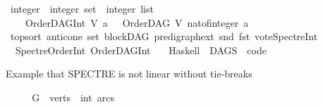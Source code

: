 \begin{isabellebody}
\ integer\ {\isasymRightarrow}\ {\isacharparenleft}{\kern0pt}integer\ set\ {\isasymtimes}\ integer\ list{\isacharparenright}{\kern0pt}{\isachardoublequoteclose}\ \isanewline
\ \ \ {\isachardoublequoteopen}\ OrderDAG{\isacharunderscore}{\kern0pt}Int\ V\ a\ {\isacharequal}{\kern0pt}\ \ {\isacharparenleft}{\kern0pt}OrderDAG\ V\ {\isacharparenleft}{\kern0pt}nat{\isacharunderscore}{\kern0pt}of{\isacharunderscore}{\kern0pt}integer\ a{\isacharparenright}{\kern0pt}{\isacharparenright}{\kern0pt}{\isachardoublequoteclose}\isanewline
\isanewline
\isanewline
{}\isamarkupfalse%
\ top{\isacharunderscore}{\kern0pt}sort\ anticone\ set\ blockDAG\ pre{\isacharunderscore}{\kern0pt}digraph{\isacharunderscore}{\kern0pt}ext\ snd\ fst\ vote{\isacharunderscore}{\kern0pt}Spectre{\isacharunderscore}{\kern0pt}Int\isanewline
\ \ SpectreOrder{\isacharunderscore}{\kern0pt}Int\ OrderDAG{\isacharunderscore}{\kern0pt}Int\isanewline
\ \ \ Haskell\ \ DAGS\ \ {\isachardoublequoteopen}code{\isacharslash}{\kern0pt}{\isachardoublequoteclose}%
\isadelimdocument
%
\endisadelimdocument
%
\isatagdocument
%
\isamarkuptrue%
%
\endisatagdocument
{\isafolddocument}%
%
\isadelimdocument
%
\endisadelimdocument
%
\begin{isamarkuptext}%
Example that SPECTRE is not linear without tie-breaks%
\end{isamarkuptext}\isamarkuptrue%
\isamarkupfalse%
\ \isanewline
%
\isadelimproof
\ \ %
\endisadelimproof
%
\isatagproof
{}\isamarkupfalse%
\ {\isacharquery}{\kern0pt}G\ {\isacharequal}{\kern0pt}\ {\isachardoublequoteopen}{\isasymlparr}verts\ {\isacharequal}{\kern0pt}\ {\isacharbraceleft}{\kern0pt}{}{\isacharcolon}{\kern0pt}{\isacharcolon}{\kern0pt}int{\isacharcomma}{\kern0pt}{}{\isacharcomma}{\kern0pt}{}{\isacharcomma}{\kern0pt}{}{\isacharcomma}{\kern0pt}{}{\isacharcomma}{\kern0pt}{}{\isacharcomma}{\kern0pt}{}{\isacharcomma}{\kern0pt}{}{\isacharcomma}{\kern0pt}{}{\isacharcomma}{\kern0pt}{}{}{\isacharbraceright}{\kern0pt}{\isacharcomma}{\kern0pt}\ arcs\ {\isacharequal}{\kern0pt}\ {\isacharbraceleft}{\kern0pt}{\isacharparenleft}{\kern0pt}{}{\isacharcomma}{\kern0pt}{}{\isacharparenright}{\kern0pt}{\isacharcomma}{\kern0pt}{\isacharparenleft}{\kern0pt}{}{\isacharcomma}{\kern0pt}{}{\isacharparenright}{\kern0pt}{\isacharcomma}{\kern0pt}{\isacharparenleft}{\kern0pt}{}{\isacharcomma}{\kern0pt}{}{\isacharparenright}{\kern0pt}{\isacharcomma}{\kern0pt}\isanewline

\end{isabellebody}
